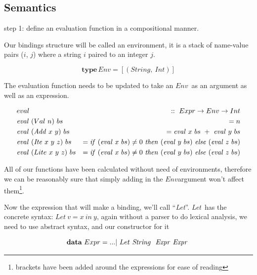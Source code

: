 \documentclass {article}
\begin{document}
\newcommand{\Context}{\mathit{Context\ }}
\newcommand{\Cxt}{\mathit{Cxt\ }}
\newcommand{\Contextt}{\textit{Context\ }}
\newcommand{\Cxtt}{\textit{Cxt\ }}
\newcommand{\leet}{\textit{Let}}
\newcommand{\Let}{\mathit{Let\ }}
\newcommand{\Var}{\mathit{Var\ }}
\newcommand{\VAR}{\mathit{VAR\ }}
\newcommand{\var}{\textit{Var}}
\newcommand{\cxtm}{\mathit{cxt\ }}
\newcommand{\TEL}{\mathit{TEL\ }}
\newcommand{\LET}{\mathit{LET\ }}


\subsection{Semantics}

step 1: define an evaluation 
	function in a compositional manner.

Our bindings structure will be called
an environment, it is a stack
of name-value pairs ($i$, $j$) where
a string $i$ paired to an integer $j$.
\newcommand{\env}{$Env$}

	\[ \textbf{type} \, Env = [(String,\ Int)]\]

The evaluation function needs to be updated
to take an \env\ as an argument as well as
an expression.

\begin{eqnarray*}
	&eval              	   		&::\  Expr \rightarrow Env \rightarrow Int \\
	&\evalf  (Val\ n)\ bs 		&=   n \\
	&\evalf  (\Add x\ y)\ bs		&=   \evalf  x\ bs\ +\ \evalf  y\ bs \\
	&\evalf  (\Ite x\ y\ z)\ bs	&=   \ifff (\evalf  x\ bs) \not= 0\ \tthen (\evalf  y\ bs)\ \eelse (\evalf  z\ bs) \\
	&\evalf  (Lite\ x\ y\ z)\ bs 	&=   \ifff (\evalf  x\ bs) \not= 0\ \tthen (\evalf  y\ bs)\ \eelse (\evalf  z\ bs)
\end{eqnarray*}

All of our functions
have been calculated without need of environments,
therefore we can be reasonably sure that simply adding in the
\env argument won't affect them\footnote{
brackets have been added around the expressions for ease of reading}.

Now the expression that will make a binding,
we'll call ``\leet''.
\leet\ has the concrete syntax:
\( \Let v = x\ in\ y\),
again without a parser to do
lexical analysis, we need to use
abstract syntax, and our constructor
for it

	\[ \textbf{data}\ Expr = ... |\ Let\ \String\ \Expr \Expr \]
\end{document}
